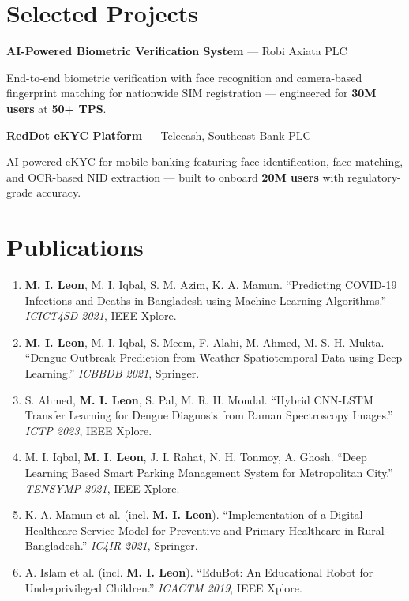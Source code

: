 \documentclass[10pt,a4paper]{article}
\begin{document}
\section{Selected Projects}

\noindent\textbf{AI-Powered Biometric Verification System} --- Robi Axiata PLC\par
End-to-end biometric verification with face recognition and camera-based fingerprint matching for nationwide SIM registration --- engineered for \textbf{30M users} at \textbf{50+ TPS}.

\vspace{0.25em}
\noindent\textbf{RedDot eKYC Platform} --- Telecash, Southeast Bank PLC\par
AI-powered eKYC for mobile banking featuring face identification, face matching, and OCR-based NID extraction --- built to onboard \textbf{20M users} with regulatory-grade accuracy.

\section{Publications}
\small
\begin{enumerate}
  \item \textbf{M. I. Leon}, M. I. Iqbal, S. M. Azim, K. A. Mamun. ``Predicting COVID-19 Infections and Deaths in Bangladesh using Machine Learning Algorithms.'' \textit{ICICT4SD 2021}, IEEE Xplore.
  \item \textbf{M. I. Leon}, M. I. Iqbal, S. Meem, F. Alahi, M. Ahmed, M. S. H. Mukta. ``Dengue Outbreak Prediction from Weather Spatiotemporal Data using Deep Learning.'' \textit{ICBBDB 2021}, Springer.
  \item S. Ahmed, \textbf{M. I. Leon}, S. Pal, M. R. H. Mondal. ``Hybrid CNN-LSTM Transfer Learning for Dengue Diagnosis from Raman Spectroscopy Images.'' \textit{ICTP 2023}, IEEE Xplore.
  \item M. I. Iqbal, \textbf{M. I. Leon}, J. I. Rahat, N. H. Tonmoy, A. Ghosh. ``Deep Learning Based Smart Parking Management System for Metropolitan City.'' \textit{TENSYMP 2021}, IEEE Xplore.
  \item K. A. Mamun et al. (incl. \textbf{M. I. Leon}). ``Implementation of a Digital Healthcare Service Model for Preventive and Primary Healthcare in Rural Bangladesh.'' \textit{IC4IR 2021}, Springer.
  \item A. Islam et al. (incl. \textbf{M. I. Leon}). ``EduBot: An Educational Robot for Underprivileged Children.'' \textit{ICACTM 2019}, IEEE Xplore.
\end{enumerate}
\normalsize
\end{document}
